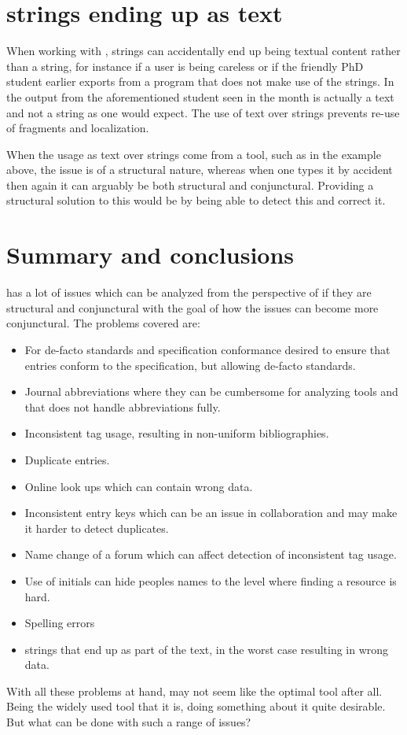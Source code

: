 \section{{\bibtex} strings ending up as text}
\label{sec:problems_strings_as_text}

When working with {\bibtex}, strings can accidentally end up being
textual content rather than a string, for instance if a user is being
careless or if the friendly PhD student earlier exports from a program
that does not make use of the strings.  In the output from the
aforementioned student seen in  the month
is actually a text and not a string as one would expect.  The use of
text over strings prevents re-use of fragments and localization.

When the usage as text over strings come from a tool, such as in the
example above, the issue is of a structural nature, whereas when one
types it by accident then again it can arguably be both structural and
conjunctural.  Providing a structural solution to this would be by
being able to detect this and correct it.


\section{Summary and conclusions}
\label{sec:problems_conclusion}

{\bibtex} has a lot of issues which can be analyzed from the
perspective of if they are structural and conjunctural with the goal
of how the issues can become more conjunctural.  The problems covered
are:

\begin{itemize}
\item For de-facto standards and specification conformance desired to
  ensure that entries conform to the {\bibtex} specification, but
  allowing de-facto standards.
\item Journal abbreviations where they can be cumbersome for analyzing
  tools and that {\bibtex} does not handle abbreviations fully.
\item Inconsistent tag usage, resulting in non-uniform bibliographies.
\item Duplicate entries.
\item Online look ups which can contain wrong data.
\item Inconsistent entry keys which can be an issue in collaboration
  and may make it harder to detect duplicates.
\item Name change of a forum which can affect detection of
  inconsistent tag usage.
\item Use of initials can hide peoples names to the level where
  finding a resource is hard.
\item Spelling errors
\item {\bibtex} strings that end up as part of the text, in the worst
  case resulting in wrong data.
\end{itemize}

With all these problems at hand, {\bibtex} may not seem like the
optimal tool after all.  Being the widely used tool that it is, doing
something about it quite desirable.  But what can be done with such a
range of issues?
